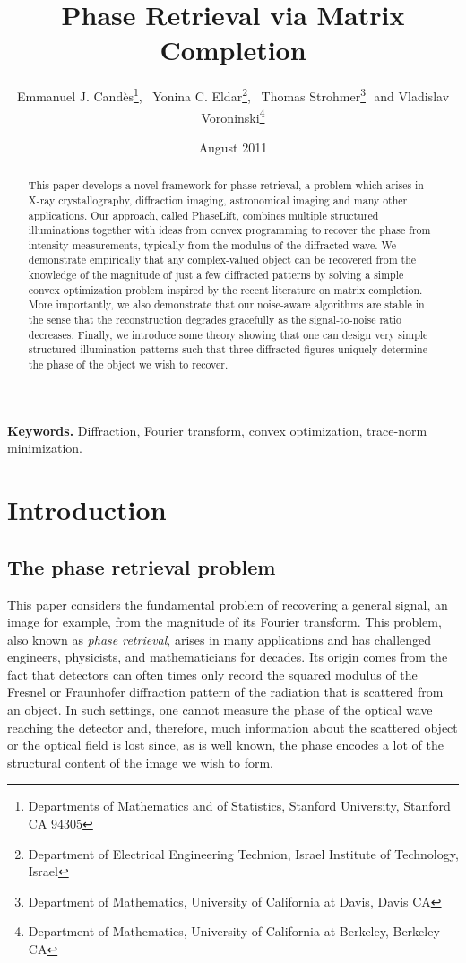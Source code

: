 \documentclass[11pt]{article}
\title{Phase Retrieval via Matrix Completion}
\author{Emmanuel J. Cand\`{e}s\thanks{Departments of Mathematics and
    of Statistics, Stanford University, Stanford CA 94305}, \, Yonina
  C. Eldar\thanks{Department of Electrical Engineering Technion, Israel
    Institute of Technology, Israel}, \, Thomas
  Strohmer\thanks{Department of Mathematics, University of California
    at Davis, Davis CA}\,\, and Vladislav Voroninski\thanks{Department of
    Mathematics, University of California at Berkeley, Berkeley CA}}
\date{August 2011}
\newcommand{\<}{\langle}
\renewcommand{\>}{\rangle}
\numberwithin{equation}{section}
\begin{document}

\maketitle


\vspace{-0.3in}

\begin{abstract}
  This paper develops a novel framework for phase retrieval, a problem
  which arises in X-ray crystallography, diffraction imaging,
  astronomical imaging and many other applications. Our approach, 
  called PhaseLift,
  combines multiple structured illuminations together with ideas from
  convex programming to recover the phase from intensity measurements,
  typically from the modulus of the diffracted wave.  We demonstrate
  empirically that any complex-valued object can be recovered from the
  knowledge of the magnitude of just a few diffracted patterns by
  solving a simple convex optimization problem inspired by the recent
  literature on matrix completion. More importantly, we also
  demonstrate that our noise-aware algorithms are stable in the sense
  that the reconstruction degrades gracefully as the signal-to-noise
  ratio decreases. Finally, we introduce some theory showing that one
  can design very simple structured illumination patterns such that
  three diffracted figures uniquely determine the phase of the object
  we wish to recover.
  \end{abstract}

{\bf Keywords.} Diffraction, Fourier transform, convex optimization,
trace-norm minimization.

\section{Introduction}
\label{sec:intro}

\subsection{The phase retrieval problem}

This paper considers the fundamental problem of recovering a general
signal, an image for example, from the magnitude of its Fourier
transform. This problem, also known as {\em phase retrieval}, arises
in many applications and has challenged engineers, physicists, and
mathematicians for decades.  Its origin comes from the fact
that detectors can often times only record the squared modulus of the
Fresnel or Fraunhofer diffraction pattern of the radiation that is
scattered from an object. In such settings, one cannot measure the
phase of the optical wave reaching the detector and, therefore, much
information about the scattered object or the optical field is lost
since, as is well known, the phase encodes a lot of the structural
content of the image we wish to form. 
\end{document}
